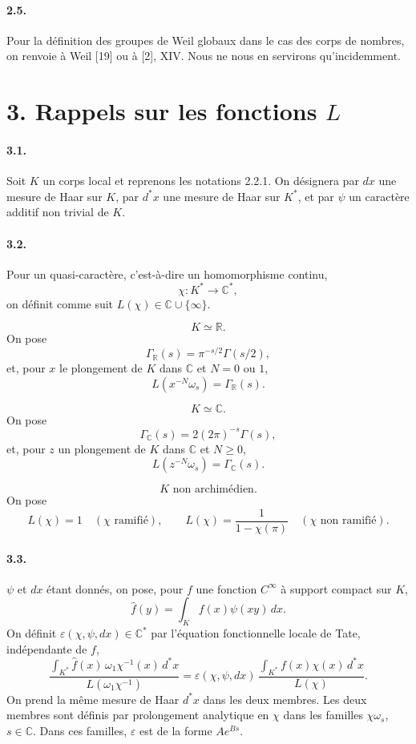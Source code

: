 \documentclass[10pt]{article}
\newcommand{\C}{\mathbb C}
\providecommand{\R}{\mathbb R}
\begin{document}
\paragraph{2.5.} Pour la définition des groupes de Weil globaux dans le cas des corps de nombres, on renvoie à Weil [19] ou à [2], XIV. Nous ne nous en servirons qu'incidemment.

\section*{3. Rappels sur les fonctions \(L\)}

\paragraph{3.1.} Soit \(K\) un corps local et reprenons les notations 2.2.1. On désignera par \(dx\) une mesure de Haar sur \(K\), par \(d^*x\) une mesure de Haar sur \(K^*\), et par \(\psi\) un caractère additif non trivial de \(K\).

\paragraph{3.2.} Pour un quasi-caractère, c'est-à-dire un homomorphisme continu,
\[
\chi:K^*\longrightarrow\C^*,
\]
on définit comme suit \(L(\chi)\in\C\cup\{\infty\}\).

\[
\tag{3.2.1}
K\simeq\R.
\]
On pose
\[
\Gamma_\R(s)=\pi^{-s/2}\Gamma(s/2),
\]
et, pour \(x\) le plongement de \(K\) dans \(\C\) et \(N=0\) ou \(1\),
\[
L(x^{-N}\omega_s)=\Gamma_\R(s).
\]

\[
\tag{3.2.2}
K\simeq\C.
\]
On pose
\[
\Gamma_\C(s)=2(2\pi)^{-s}\Gamma(s),
\]
et, pour \(z\) un plongement de \(K\) dans \(\C\) et \(N\ge0\),
\[
L(z^{-N}\omega_s)=\Gamma_\C(s).
\]

\[
\tag{3.2.3}
K\text{ non archimédien.}
\]
On pose
\[
L(\chi)=1\quad(\chi\text{ ramifié}),
\qquad
L(\chi)=\frac1{1-\chi(\pi)}\quad(\chi\text{ non ramifié}).
\]

\paragraph{3.3.} \(\psi\) et \(dx\) étant donnés, on pose, pour \(f\) une fonction \(C^\infty\) à support compact sur \(K\),
\[
\widehat f(y)=\int_K f(x)\psi(xy)\,dx.
\]
On définit \(\varepsilon(\chi,\psi,dx)\in\C^*\) par l'équation fonctionnelle locale de Tate, indépendante de \(f\),
\[
\tag{3.3.1}
\frac{\displaystyle\int_{K^*}\widehat f(x)\,\omega_1\chi^{-1}(x)\,d^*x}
     {L(\omega_1\chi^{-1})}
=
\varepsilon(\chi,\psi,dx)\,
\frac{\displaystyle\int_{K^*}f(x)\chi(x)\,d^*x}
     {L(\chi)}.
\]
On prend la même mesure de Haar \(d^*x\) dans les deux membres. Les deux membres sont définis par prolongement analytique en \(\chi\) dans les familles \(\chi\omega_s\), \(s\in\C\). Dans ces familles, \(\varepsilon\) est de la forme \(Ae^{Bs}\).
\end{document}
